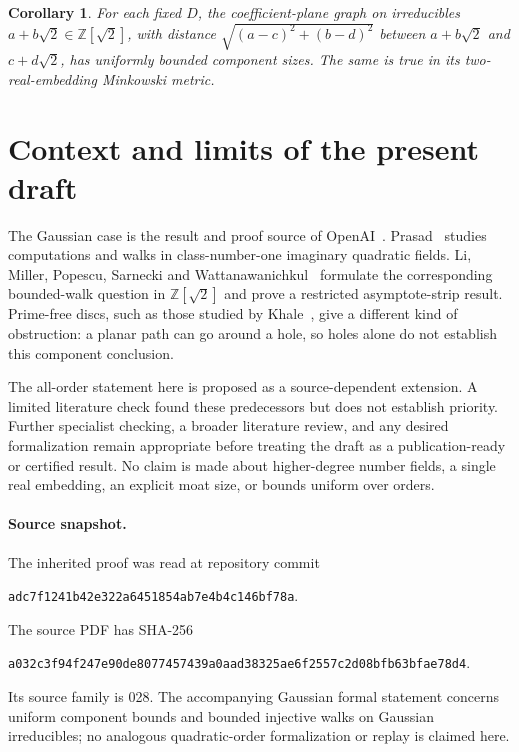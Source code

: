 \documentclass[11pt]{article}
\numberwithin{equation}{section}
\newtheorem{corollary}[theorem]{Corollary}
\theoremstyle{definition}\newtheorem{definition}[theorem]{Definition}
\theoremstyle{remark}\newtheorem{remark}[theorem]{Remark}
\newcommand{\Z}{\mathbb Z}\newcommand{\Q}{\mathbb Q}\newcommand{\R}{\mathbb R}
\begin{document}
\begin{corollary}
For each fixed $D$, the coefficient-plane graph on irreducibles $a+b\sqrt2\in\Z[\sqrt2]$, with distance
$\sqrt{(a-c)^2+(b-d)^2}$ between $a+b\sqrt2$ and $c+d\sqrt2$, has uniformly bounded component sizes. The same is true in its two-real-embedding Minkowski metric.
\end{corollary}

\section{Context and limits of the present draft}

The Gaussian case is the result and proof source of OpenAI~\cite{openai}. Prasad~\cite{prasad} studies computations and walks in class-number-one imaginary quadratic fields. Li, Miller, Popescu, Sarnecki and Wattanawanichkul~\cite{li} formulate the corresponding bounded-walk question in $\Z[\sqrt2]$ and prove a restricted asymptote-strip result. Prime-free discs, such as those studied by Khale~\cite{khale}, give a different kind of obstruction: a planar path can go around a hole, so holes alone do not establish this component conclusion.

The all-order statement here is proposed as a source-dependent extension. A limited literature check found these predecessors but does not establish priority. Further specialist checking, a broader literature review, and any desired formalization remain appropriate before treating the draft as a publication-ready or certified result. No claim is made about higher-degree number fields, a single real embedding, an explicit moat size, or bounds uniform over orders.

\paragraph{Source snapshot.}
The inherited proof was read at repository commit
\begin{center}\small\texttt{adc7f1241b42e322a6451854ab7e4b4c146bf78a}.\end{center}
The source PDF has SHA-256
\begin{center}\small\texttt{a032c3f94f247e90de8077457439a0aad38325ae6f2557c2d08bfb63bfae78d4}.\end{center}
Its source family is 028. The accompanying Gaussian formal statement concerns uniform component bounds and bounded injective walks on Gaussian irreducibles; no analogous quadratic-order formalization or replay is claimed here.
\end{document}
